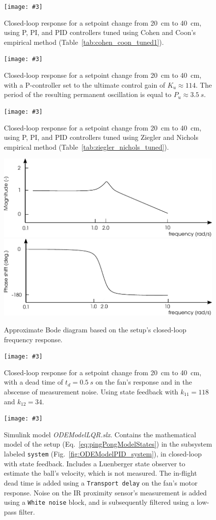 \documentclass[10pt,twoside,openright]{article}
\newcommand{\mijnfiguur}[5][ht]{            %
    \begin{figure}[#1]                      %
        \begin{center}                      %
            \texttt{[image: \#3]}        %
        \end{center}
        \caption{#4\label{#5}}          %
    \end{figure}
    }
\begin{document}
\mijnfiguur[h!]{width=\linewidth}{tuned_PID_cohencoon.pdf}{Closed-loop response for a setpoint change from 20~cm to 40~cm, using P, PI, and PID controllers tuned using Cohen and Coon's empirical method (Table~\ref{tab:cohen_coon_tuned1}).}{fig:tuned_PID_cohencoon}

\mijnfiguur[h!]{width=0.78\linewidth}{tuned_PID_zieglernichols_1.pdf}{Closed-loop response for a setpoint change from 20~cm to 40~cm, with a P-controller set to the ultimate control gain of $K_u \approx 114$. The period of the resulting permanent oscillation is equal to $P_u \approx 3.5~s$.}{fig:tuned_PID_zieglernichols_1}

\mijnfiguur[h!]{width=\linewidth}{tuned_PID_zieglernichols_2.pdf}{Closed-loop response for a setpoint change from 20~cm to 40~cm, using P, PI, and PID controllers tuned using Ziegler and Nichols empirical method (Table~\ref{tab:ziegler_nichols_tuned}).}{fig:tuned_PID_zieglernichols_2}

\begin{figure}[t!]
	\centering
	\includegraphics[width=0.75\linewidth]{bode_diagram_closed_1.pdf}
	\includegraphics[width=0.75\linewidth]{bode_diagram_closed_2.pdf}
	\caption{Approximate Bode diagram based on the setup's closed-loop frequency response.}
	\label{fig:approx_bode_diagram_closed}
\end{figure}

\mijnfiguur[h!]{width=\linewidth}{tuned_LQR1.pdf}{Closed-loop response for a setpoint change from 20~cm to 40~cm, with a dead time of $t_d=0.5~s$ on the fan's response and in the abscense of measurement noise. Using state feedback with $k_{11} =118$ and $k_{12} =34$.}{fig:tuned_LQR1}

\mijnfiguur[h!]{width=\linewidth}{ODEModelLQR.pdf}{Simulink model \textit{ODEModelLQR.slx}. Contains the mathematical model of the setup (Eq.~\ref{eq:pingPongModelStates}) in the subsystem labeled \texttt{system} (Fig.~\ref{fig:ODEModelPID_system}), in closed-loop with state feedback. Includes a Luenberger state observer to estimate the ball's velocity, which is not measured. The in-flight dead time is added using a \texttt{Transport delay} on the fan's motor response. Noise on the IR proximity sensor's measurement is added using a \texttt{White noise} block, and is subsequently filtered using a low-pass filter.}{fig:ODEModelLQR}
\end{document}
